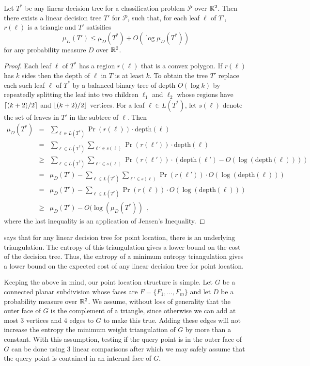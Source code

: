 \documentclass[lotsofwhite]{patmorin}
\newcommand{\depth}{\mathrm{depth}}
\begin{document}
\begin{lem}
Let $T^*$ be any linear decision tree for a classification problem
$\mathcal{P}$ over $\mathbb{R}^2$.  Then there exists a linear decision tree
$T'$ for $\mathcal{P}$, such that, for each leaf $\ell$ of $T'$,
$r(\ell)$ is a triangle and $T'$ satisifies
\[
    \mu_D(T') \le \mu_D(T^*) + O(\log\mu_D(T^*))
\]
for any probability measure $D$ over $\mathbb{R}^2$.
\end{lem}

\begin{proof}
Each leaf $\ell$ of $T^*$ has a region $r(\ell)$ that is a convex
polygon.  If $r(\ell)$ has $k$ sides then the depth of $\ell$ in $T$
is at least $k$.  To obtain the tree $T'$ replace each such leaf
$\ell$ of $T^*$ by a balanced binary tree of depth $O(\log k)$ by
repeatedly splitting the leaf into two children $\ell_1$ and $\ell_2$
whose regions have ${\left\lceil (k+2)/2 \right\rceil}$ and ${\left\lfloor (k+2)/2 \right\rfloor}$ vertices.
For a leaf $\ell\in L(T^*)$, let $s(\ell)$ denote the set of leaves in $T'$
in the subtree of $\ell$.   Then
\begin{eqnarray*}
   \mu_D(T^*) 
     &  =  & \sum_{\ell\in L(T^*)} \Pr(r(\ell))\cdot \depth(\ell) \\
     &  =  & \sum_{\ell\in L(T^*)}\sum_{\ell'\in s(\ell)} 
              \Pr(r(\ell'))\cdot \depth(\ell) \\
     & \ge & \sum_{\ell\in L(T^*)} 
             \sum_{\ell'\in s(\ell)}\Pr(r(\ell'))\cdot (\depth(\ell')
                   - O(\log (\depth(\ell)))) \\
     &  =  & \mu_D(T') - \sum_{\ell\in L(T^*)} 
             \sum_{\ell'\in s(\ell)}\Pr(r(\ell'))\cdot O(\log (\depth(\ell))) \\
     &  =  & \mu_D(T') - \sum_{\ell\in L(T^*)} 
             \Pr(r(\ell))\cdot O(\log (\depth(\ell))) \\
     & \ge & \mu_D(T') - O(\log(\mu_D(T^*)) \enspace , 
\end{eqnarray*}
where the last inequality is an application of Jensen's Inequality.
\end{proof}

 says that for any linear decision tree for point
location, there is an underlying triangulation.  The entropy of this
triangulation gives a lower bound on the cost of the decision tree.
Thus, the entropy of a minimum entropy triangulation gives a lower
bound on the expected cost of any linear decision tree for point
location.

Keeping the above in mind, our point location structure is simple.
Let $G$ be a connected planar subdivision whose faces are
$F=\{F_1,\ldots,F_m\}$ and let $D$ be a probability measure over
$\mathbb{R}^2$.  We assume, without loss of generality that the outer face of
$G$ is the complement of a triangle, since otherwise we can add at
most 3 vertices and 4 edges to $G$ to make this true.  Adding these
edges will not increase the entropy the minimum weight triangulation
of $G$ by more than a constant.  With this assumption, testing if the
query point is in the outer face of $G$ can be done using 3 linear
comparisons after which we may safely assume that the query point is
contained in an internal face of $G$.
\end{document}
